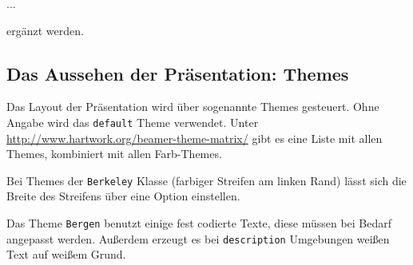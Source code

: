 \begin{lfgwcode}{}
{
...
}
\end{lfgwcode}

ergänzt werden.

\subsection{Das Aussehen der Präsentation: Themes}

Das Layout der Präsentation wird über sogenannte Themes gesteuert. Ohne
Angabe wird das \texttt{default} Theme verwendet. Unter
\url{http://www.hartwork.org/beamer-theme-matrix/} gibt es eine Liste mit
allen Themes, kombiniert mit allen Farb-Themes.

\begin{lfgwcode}{}
{
}
\end{lfgwcode}

Bei Themes der \texttt{Berkeley} Klasse (farbiger Streifen am linken Rand)
lässt sich die Breite des Streifens über eine Option einstellen.

Das Theme \texttt{Bergen} benutzt einige fest codierte Texte, diese müssen
bei Bedarf angepasst werden.  Außerdem erzeugt es bei \texttt{description}
Umgebungen weißen Text auf weißem Grund.

